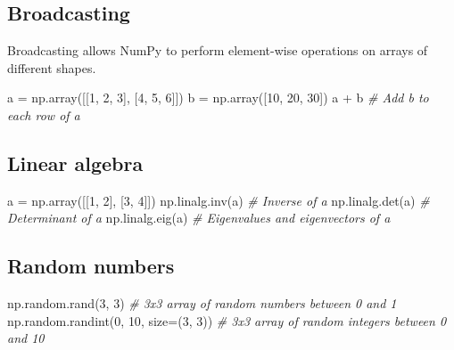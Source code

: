 \documentclass[11pt]{article}
\newenvironment{Shaded}{}{}
\newcommand{\DecValTok}[1]{\textcolor[rgb]{0.25,0.63,0.44}{{#1}}}
\newcommand{\CommentTok}[1]{\textcolor[rgb]{0.38,0.63,0.69}{\textit{{#1}}}}
\newcommand{\NormalTok}[1]{{#1}}
\newcommand{\OperatorTok}[1]{\textcolor[rgb]{0.40,0.40,0.40}{{#1}}}
\begin{document}
\subsection{\texorpdfstring{{Broadcasting}}{Broadcasting}}\label{broadcasting}

Broadcasting allows NumPy to perform element-wise operations on arrays
of different shapes.

\begin{Shaded}
\begin{Highlighting}[]
\NormalTok{    a }\OperatorTok{=}\NormalTok{ np.array([[}\DecValTok{1}\NormalTok{, }\DecValTok{2}\NormalTok{, }\DecValTok{3}\NormalTok{], [}\DecValTok{4}\NormalTok{, }\DecValTok{5}\NormalTok{, }\DecValTok{6}\NormalTok{]])}
\NormalTok{    b }\OperatorTok{=}\NormalTok{ np.array([}\DecValTok{10}\NormalTok{, }\DecValTok{20}\NormalTok{, }\DecValTok{30}\NormalTok{])}
\NormalTok{    a }\OperatorTok{+}\NormalTok{ b        }\CommentTok{\# Add b to each row of a}
\end{Highlighting}
\end{Shaded}

\subsection{\texorpdfstring{{Linear
algebra}}{Linear algebra}}\label{linear-algebra}

\begin{Shaded}
\begin{Highlighting}[]
\NormalTok{    a }\OperatorTok{=}\NormalTok{ np.array([[}\DecValTok{1}\NormalTok{, }\DecValTok{2}\NormalTok{], [}\DecValTok{3}\NormalTok{, }\DecValTok{4}\NormalTok{]])}
\NormalTok{    np.linalg.inv(a)  }\CommentTok{\# Inverse of a}
\NormalTok{    np.linalg.det(a)  }\CommentTok{\# Determinant of a}
\NormalTok{    np.linalg.eig(a)  }\CommentTok{\# Eigenvalues and eigenvectors of a}
\end{Highlighting}
\end{Shaded}

\subsection{\texorpdfstring{{Random
numbers}}{Random numbers}}\label{random-numbers}

\begin{Shaded}
\begin{Highlighting}[]
\NormalTok{    np.random.rand(}\DecValTok{3}\NormalTok{, }\DecValTok{3}\NormalTok{)  }\CommentTok{\# 3x3 array of random numbers between 0 and 1}
\NormalTok{    np.random.randint(}\DecValTok{0}\NormalTok{, }\DecValTok{10}\NormalTok{, size}\OperatorTok{=}\NormalTok{(}\DecValTok{3}\NormalTok{, }\DecValTok{3}\NormalTok{))  }\CommentTok{\# 3x3 array of random integers between 0 and 10}
\end{Highlighting}
\end{Shaded}
\end{document}
